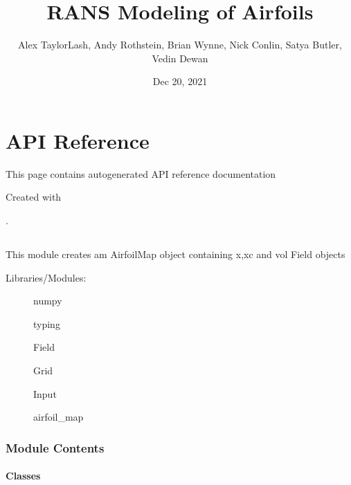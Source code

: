 \documentclass[letterpaper,10pt,english]{sphinxmanual}
\title{RANS Modeling of Airfoils}
\date{Dec 20, 2021}
\author{Alex Taylor\sphinxhyphen{}Lash, Andy Rothstein, Brian Wynne, Nick Conlin, Satya Butler, Vedin Dewan}
\begin{document}
\pagestyle{empty}
\sphinxmaketitle
\pagestyle{plain}
\sphinxtableofcontents
\pagestyle{normal}
\label{\detokenize{index::doc}}



\chapter{API Reference}
\label{\detokenize{autoapi/index:api-reference}}\label{\detokenize{autoapi/index::doc}}
\sphinxAtStartPar
This page contains auto\sphinxhyphen{}generated API reference documentation %
\begin{footnote}[1]\sphinxAtStartFootnote
Created with 
%
\end{footnote}.


\section{}
\label{\detokenize{autoapi/AirfoilMap/index:module-AirfoilMap}}\label{\detokenize{autoapi/AirfoilMap/index:airfoilmap}}\label{\detokenize{autoapi/AirfoilMap/index::doc}}
\sphinxAtStartPar
This module creates am AirfoilMap object containing x,xc and vol Field objects
\begin{description}
\item[{Libraries/Modules:}] \leavevmode
\sphinxAtStartPar
numpy

\sphinxAtStartPar
typing

\sphinxAtStartPar
Field

\sphinxAtStartPar
Grid

\sphinxAtStartPar
Input

\sphinxAtStartPar
airfoil\_map

\end{description}


\subsection{Module Contents}
\label{\detokenize{autoapi/AirfoilMap/index:module-contents}}

\subsubsection{Classes}
\label{\detokenize{autoapi/AirfoilMap/index:classes}}
\end{document}
